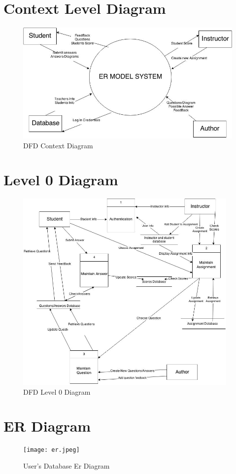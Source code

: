\begin{minipage}{\textwidth}
	\chapter{Context Level Diagram}

		\begin{figure}[H]
			  \centerline{ \includegraphics[height=6cm]{ContextDiagram.jpg}}
				\caption{DFD Context Diagram}
		\end{figure}
\end{minipage}

\begin{minipage}{\textwidth}
	\chapter{Level 0 Diagram}
		\begin{figure}[H]
				\centerline{\includegraphics[height=10cm]{DFDLevel0.jpg}}
				\caption{DFD Level 0 Diagram}
		\end{figure}
\end{minipage}

\begin{minipage}{\textwidth}
	\chapter{ER Diagram}
		\begin{figure}[H]
				\centerline{\texttt{[image: er.jpeg]}}
				\caption{User's Database Er Diagram }
		\end{figure}
\end{minipage}